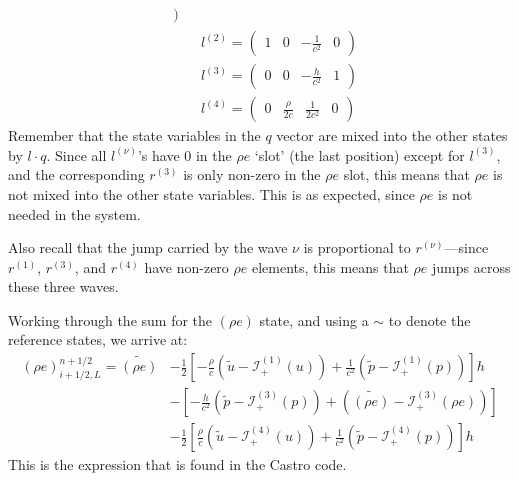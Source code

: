 \begin{itemize}
\begin{eqnarray}
\begin{array}{cccc}
            \end{array} ) \nonumber \\
&&
l^{(2)} = ( \begin{array}{cccc} 1 & 0 & -\frac{1}{c^2} & 0 
            \end{array} ) \nonumber \\
&&
l^{(3)} = ( \begin{array}{cccc} 0 & 0 & -\frac{h}{c^2} & 1 
            \end{array} ) \nonumber \\
&&
l^{(4)} = ( \begin{array}{cccc} 0 & \frac{\rho}{2c} & \frac{1}{2c^2} & 0 
            \end{array} )
\end{eqnarray}
Remember that the state variables in the $q$ vector are mixed into the
other states by $l \cdot q$.  Since all $l^{(\nu)}$'s have $0$ in the
$\rho e$ `slot' (the last position) except for $l^{(3)}$, and the
corresponding $r^{(3)}$ is only non-zero in the $\rho e$ slot, this
means that $\rho e$ is not mixed into the other state variables.  This
is as expected, since $\rho e$ is not needed in the system.

Also recall that the jump carried by the wave $\nu$ is proportional
to $r^{(\nu)}$---since $r^{(1)}$, $r^{(3)}$, and $r^{(4)}$ have
non-zero $\rho e$ elements, this means that $\rho e$ jumps across 
these three waves.

Working through the sum for the $(\rho e)$ state, and using a $\sim$ to
denote the reference states, we arrive at:
\begin{align}
(\rho e)_{i+1/2,L}^{n+1/2} = \widetilde{(\rho e)} &-
   \frac{1}{2} \left [ -\frac{\rho}{c} \left (\tilde{u} - \mathcal{I}^{(1)}_+(u) \right )
                       +\frac{1}{c^2} \left (\tilde{p} - \mathcal{I}^{(1)}_+(p) \right )
               \right ] h \nonumber \\
  &-
    \left [ -\frac{h}{c^2} \left (\tilde{p} - \mathcal{I}^{(3)}_+(p) \right )
                       + \left (\widetilde{(\rho e)} - \mathcal{I}^{(3)}_+(\rho e) \right )
               \right ] \nonumber \\
  &-
   \frac{1}{2} \left [ \frac{\rho}{c} \left (\tilde{u} - \mathcal{I}^{(4)}_+(u) \right )
                       +\frac{1}{c^2} \left (\tilde{p} - \mathcal{I}^{(4)}_+(p) \right )
               \right ] h 
\end{align}
This is the expression that is found in the Castro code.



\end{itemize}
